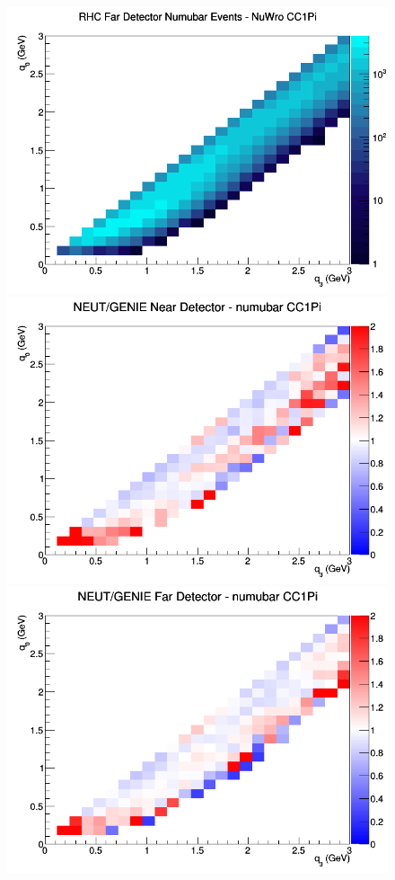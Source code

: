 \documentclass[12pt]{article}
\begin{document}
\begin{figure}[h]
\endminipage
{}
\includegraphics[width=\linewidth]{q0_q3/nominal/CC1Pi_RHC_FD_numubar_q3_q0_NuWro.png}
\endminipage
\newline
{}
\includegraphics[width=\linewidth]{q0_q3/nominal/ratios/CC1Pi_NEUT_GENIE_numubar_near_q3_q0.png}
\endminipage
{}
\includegraphics[width=\linewidth]{q0_q3/nominal/ratios/CC1Pi_NEUT_GENIE_numubar_far_q3_q0.png}

\end{figure}
\end{document}
